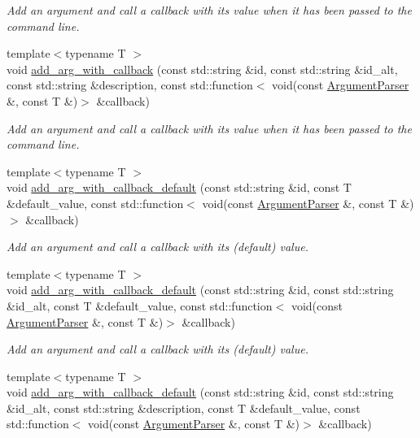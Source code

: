 \begin{DoxyCompactItemize}
\begin{DoxyCompactList}\small\item\em Add an argument and call a callback with its value when it has been passed to the command line. \end{DoxyCompactList}\item 
{\footnotesize template$<$typename T $>$ }\\void \hyperlink{classcppargparse_1_1parser_1_1ArgumentParser_aace5e7d0b1dd1831bc06ae7d3c3f2725}{add\+\_\+arg\+\_\+with\+\_\+callback} (const std\+::string \&id, const std\+::string \&id\+\_\+alt, const std\+::string \&description, const std\+::function$<$ void(const \hyperlink{classcppargparse_1_1parser_1_1ArgumentParser}{Argument\+Parser} \&, const T \&)$>$ \&callback)
\begin{DoxyCompactList}\small\item\em Add an argument and call a callback with its value when it has been passed to the command line. \end{DoxyCompactList}\item 
{\footnotesize template$<$typename T $>$ }\\void \hyperlink{classcppargparse_1_1parser_1_1ArgumentParser_a63d7feb48b03e26cc64ccd22382685d4}{add\+\_\+arg\+\_\+with\+\_\+callback\+\_\+default} (const std\+::string \&id, const T \&default\+\_\+value, const std\+::function$<$ void(const \hyperlink{classcppargparse_1_1parser_1_1ArgumentParser}{Argument\+Parser} \&, const T \&)$>$ \&callback)
\begin{DoxyCompactList}\small\item\em Add an argument and call a callback with its (default) value. \end{DoxyCompactList}\item 
{\footnotesize template$<$typename T $>$ }\\void \hyperlink{classcppargparse_1_1parser_1_1ArgumentParser_a8bc57f2778cc9ba82dfd0f255376ab4a}{add\+\_\+arg\+\_\+with\+\_\+callback\+\_\+default} (const std\+::string \&id, const std\+::string \&id\+\_\+alt, const T \&default\+\_\+value, const std\+::function$<$ void(const \hyperlink{classcppargparse_1_1parser_1_1ArgumentParser}{Argument\+Parser} \&, const T \&)$>$ \&callback)
\begin{DoxyCompactList}\small\item\em Add an argument and call a callback with its (default) value. \end{DoxyCompactList}\item 
{\footnotesize template$<$typename T $>$ }\\void \hyperlink{classcppargparse_1_1parser_1_1ArgumentParser_a4693605cbe40d87c0a23546a5e61fa97}{add\+\_\+arg\+\_\+with\+\_\+callback\+\_\+default} (const std\+::string \&id, const std\+::string \&id\+\_\+alt, const std\+::string \&description, const T \&default\+\_\+value, const std\+::function$<$ void(const \hyperlink{classcppargparse_1_1parser_1_1ArgumentParser}{Argument\+Parser} \&, const T \&)$>$ \&callback)

\end{DoxyCompactItemize}
